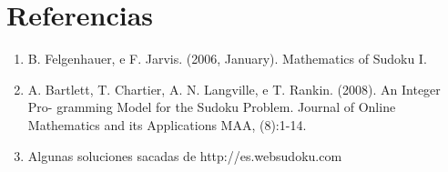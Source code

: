 \documentclass[10pt,a4paper]{article}
\begin{document}

\fecha{\today}




\maketitle

\newpage
\tableofcontents

\newpage


\newpage


\newpage


\newpage


\section{Referencias}

\begin{enumerate}
  \item B. Felgenhauer, e F. Jarvis. (2006, January). Mathematics of Sudoku I. 
  \item A. Bartlett, T. Chartier, A. N. Langville, e T. Rankin. (2008). An Integer Pro- gramming Model for the Sudoku Problem. Journal of Online Mathematics and its Applications MAA, (8):1-14.
  \item Algunas soluciones sacadas de http://es.websudoku.com 
\end{enumerate}
\end{document}
